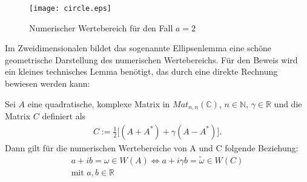 \begin{ex}
\begin{enumerate}[label=(\roman*)]
		\begin{figure}[H]
			\caption{Numerischer Wertebereich für den Fall $a=2$}
			\texttt{[image: circle.eps]}
		\end{figure}
	\end{enumerate}
	
\end{ex}

Im Zweidimensionalen bildet das sogenannte Ellipsenlemma \parencite[S. 3ff]{gustafson1997numerical} eine schöne geometrische Darstellung des numerischen Wertebereichs. Für den Beweis wird ein kleines technisches Lemma benötigt, das durch eine direkte Rechnung bewiesen werden kann:

\begin{lem} \label{lem:hlem_ellipse}
	Sei $A$ eine quadratische, komplexe Matrix in $\mathit{Mat}_{n,n}(\mathbb{C})$, $n\in \mathbb{N}$, $\gamma \in \mathbb{R}$ und die Matrix $C$ definiert als
	\begin{align*}
		C := \frac{1}{2} \bigg[ (A+A^*)+\gamma(A-A^*) \bigg].
	\end{align*}
	Dann gilt für die numerischen Wertebereiche von A und C folgende Beziehung:
	\begin{align*}
		a+ib=\omega \in W(A) \iff a+ i \gamma b= \widetilde{\omega} \in W(C) \\
		\text{mit }  a, b \in \mathbb{R}
	\end{align*}
\end{lem}

